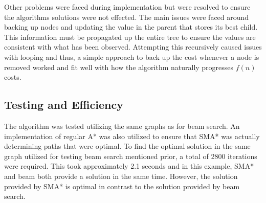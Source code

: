 \documentclass[]{article}
\begin{document}
Other problems were faced during implementation but were resolved to ensure the algorithms solutions were not effected. The main issues were faced around backing up nodes and updating the value in the parent that stores its best child. This information must be propagated up the entire tree to ensure the values are consistent with what has been observed. Attempting this recursively caused issues with looping and thus, a simple approach to back up the cost whenever a node is removed worked and fit well with how the algorithm naturally progresses $f(n)$ costs.

\subsection*{Testing and Efficiency}

The algorithm was tested utilizing the same graphs as for beam search. An implementation of regular A* was also utilized to ensure that SMA* was actually determining paths that were optimal. To find the optimal solution in the same graph utilized for testing beam search mentioned prior, a total of 2800 iterations were required. This took approximately 2.1 seconds and in this example, SMA* and beam both provide a solution in the same time. However, the solution provided by SMA* is optimal in contrast to the solution provided by beam search.


\break
\setlength{}
\printbibliography[title={References}]

\end{document}
